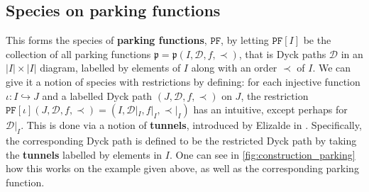 \documentclass[12pt, reqno]{amsart}
\theoremstyle{definition}
\begin{document}
\subsection{Species on parking functions}

This forms the species of \textbf{parking functions}, $\mathtt{PF}$, by letting $\mathtt{PF}[I]$ be the collection of all parking functions $\mathfrak{p} = \mathfrak{p}(I, \mathcal D, f, \prec)$, that is Dyck paths $\mathcal D$ in an $|I|\times |I|$ diagram, labelled by elements of $I$ along with an order $\prec$ of $I$.
We can give it a notion of species with restrictions by defining: for each injective function $\iota : I \hookrightarrow J $ and a labelled Dyck path $(J, \mathcal D, f, \prec)$ on $J$, the restriction $\mathtt{PF}[\iota](J, \mathcal D, f, \prec) = (I, \mathcal D|_I, f|_I, \prec|_I)$ has an intuitive, except perhaps for
$\mathcal D|_I$.
This is done via a notion of \textbf{tunnels}, introduced by Elizalde in \cite{elizalde2003simple}.
Specifically, the corresponding Dyck path is defined to be the restricted Dyck path by taking the \textbf{tunnels} labelled by elements in $I$.
One can see in \cref{fig:construction_parking} how this works on the example given above, as well as the corresponding parking function.


\begin{figure}[h]
\centering
    \qquad
    \caption{\label{fig:restriction_parking}}%
\end{figure}
\end{document}

